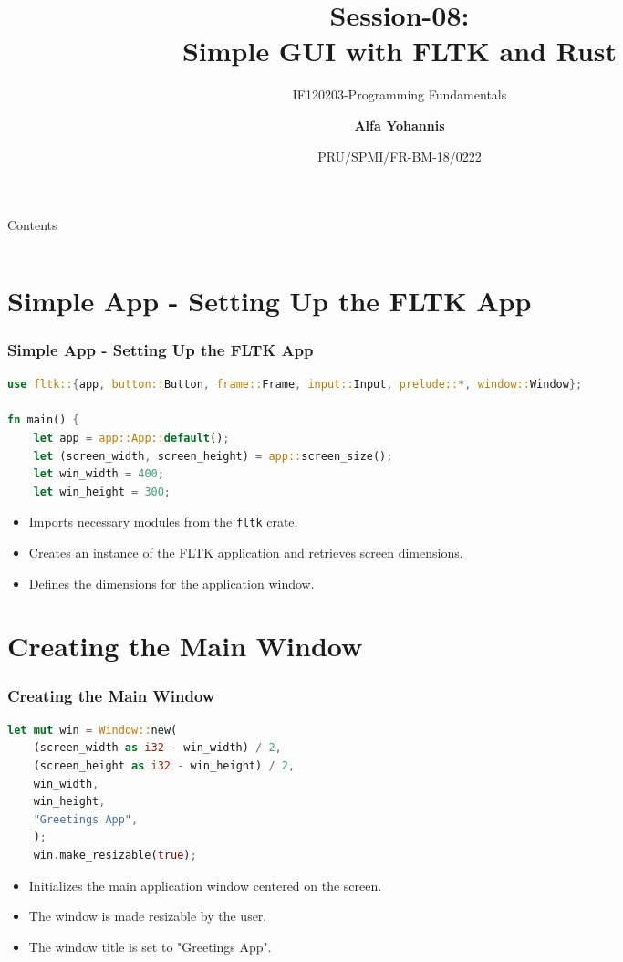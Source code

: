 \documentclass[aspectratio=169, table]{beamer}
\subtitle{IF120203-Programming Fundamentals}
\title{Session-08:\\\LARGE{Simple GUI with FLTK and Rust\\\vspace{10pt}}}
\date[Serial]{\scriptsize {PRU/SPMI/FR-BM-18/0222}}
\author[Pradita]{\small{\textbf{Alfa Yohannis}}}
\begin{document}
\frame{\titlepage}

\begin{frame}{Contents}
\vspace{15pt}
\begin{columns}[t]
\begin{column}{.5\textwidth}
	\tableofcontents[sections={1-12}]
\end{column}
\begin{column}{.5\textwidth}
	\tableofcontents[sections={13-24}]
\end{column}
\end{columns}
\end{frame}

\section{Simple App - Setting Up the FLTK App}
\begin{frame}[fragile]
\frametitle{Simple App - Setting Up the FLTK App}
\begin{lstlisting}[language=Rust]
use fltk::{app, button::Button, frame::Frame, input::Input, prelude::*, window::Window};

fn main() {
	let app = app::App::default();
	let (screen_width, screen_height) = app::screen_size();
	let win_width = 400;
	let win_height = 300;
\end{lstlisting}
\begin{itemize}
	\item Imports necessary modules from the \texttt{fltk} crate.
	\item Creates an instance of the FLTK application and retrieves screen dimensions.
	\item Defines the dimensions for the application window.
\end{itemize}
\end{frame}

\section{Creating the Main Window}
\begin{frame}[fragile]
\frametitle{Creating the Main Window}
\begin{lstlisting}[language=Rust]
	let mut win = Window::new(
	(screen_width as i32 - win_width) / 2,
	(screen_height as i32 - win_height) / 2,
	win_width,
	win_height,
	"Greetings App",
	);
	win.make_resizable(true);
\end{lstlisting}
\begin{itemize}
	\item Initializes the main application window centered on the screen.
	\item The window is made resizable by the user.
	\item The window title is set to "Greetings App".
\end{itemize}
\end{frame}
\end{document}
